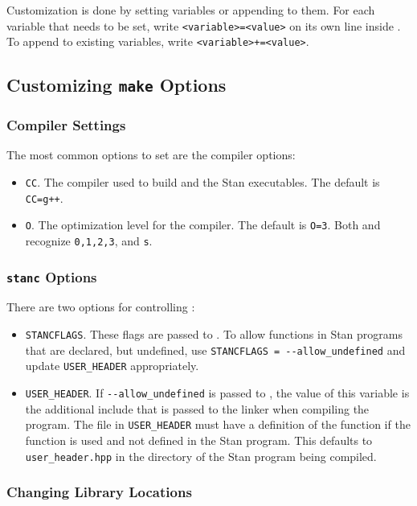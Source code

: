 Customization is done by setting variables or appending to them. For
each variable that needs to be set, write \Verb|<variable>=<value>| on
its own line inside . To append to existing
variables, write \Verb|<variable>+=<value>|.

\subsection{Customizing {\tt make} Options}

\subsubsection{Compiler Settings}

The most common options to set are the compiler options:
%
\begin{itemize}
  \item \Verb|CC|. The compiler used to build \CmdStan and the Stan
    executables. The default is \Verb|CC=g++|.
  \item \Verb|O|. The optimization level for the compiler. The default
    is \Verb|O=3|. Both \gpp and \clang recognize \Verb|0,1,2,3|, and
    \Verb|s|.
\end{itemize}

\subsubsection{{\tt stanc} Options}

There are two options for controlling \stanc:
%
\begin{itemize}
\item \Verb|STANCFLAGS|. These flags are passed to \stanc.  To allow
  functions in Stan programs that are declared, but undefined, use
  \Verb|STANCFLAGS = --allow_undefined| and update \Verb|USER_HEADER|
  appropriately.
\item \Verb|USER_HEADER|. If \Verb|--allow_undefined| is passed to
  \stanc, the value of this variable is the additional include that is
  passed to the \Cpp linker when compiling the program. The file in
  \Verb|USER_HEADER| must have a definition of the function if the function
  is used and not defined in the Stan program. This defaults to
  \Verb|user_header.hpp| in the directory of the Stan program being compiled.
\end{itemize}
%

\subsubsection{Changing Library Locations}

